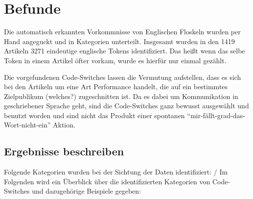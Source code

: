 \section{Befunde}


Die automatisch erkannten Vorkommnisse von Englischen Floskeln wurden per Hand angeguckt und in Kategorien unterteilt.
Insgesamt wurden in den 1419 Artikeln 3271 eindeutige englische Tokens identifiziert.
Das heißt wenn das selbe Token in einem Artikel öfter vorkam, wurde es hierfür nur einmal gezählt.


Die vorgefundenen Code-Switches lassen die Vermutung aufstellen, dass es sich bei den Artikeln um eine Art Performance handelt, die auf ein bestimmtes Zielpublikum (welches?) zugeschnitten ist.
Da es dabei um Kommunikation in geschriebener Sprache geht, sind die Code-Switches ganz bewusst ausgewählt und benutzt worden und sind nicht das Produkt einer spontanen ``mir-fällt-grad-das-Wort-nicht-ein'' Aktion.


\subsection{Ergebnisse beschreiben}

Folgende Kategorien wurden bei der Sichtung der Daten identifiziert: / Im Folgenden wird ein Überblick über die identifizierten Kategorien von Code-Switches und dazugehörige Beispiele gegeben:


